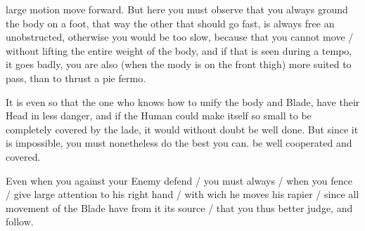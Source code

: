 \newpage


\newpage


large motion move forward. But here you must observe that you always
ground the body on a foot, that way the other that should go fast, is
always free an unobstructed, otherwise you would be too slow, because
that you cannot move / without lifting the entire weight of the body,
and if that is seen during a tempo, it goes badly, you are also (when
the mody is on the front thigh) more suited to pass, than to thrust a
pie fermo.


It is even so that the one who knows how to unify the body and Blade,
have their Head in less danger, and if the Human could make itself so
small to be completely covered by the lade, it would without doubt be
well done. But since it is impossible, you must nonetheless do the
best you can. be well cooperated and covered.


Even when you against your Enemy defend / you must always / when you
fence / give large attention to his right hand / with wich he moves
his rapier / since all movement of the Blade have from it its source /
that you thus better judge, and follow.

